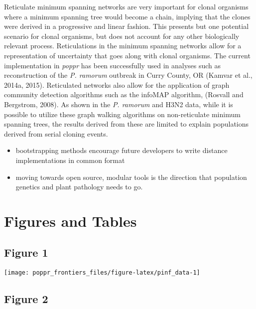 \documentclass{frontiersSCNS} %
\newenvironment{CodeChunk}{}{}
\begin{document}
Reticulate minimum spanning networks are very important for clonal
organisms where a minimum spanning tree would become a chain, implying
that the clones were derived in a progressive and linear fashion. This
presents but one potential scenario for clonal organisms, but does not
account for any other biologically relevant process. Reticulations in
the minimum spanning networks allow for a representation of uncertainty
that goes along with clonal organisms. The current implementation in
\emph{poppr} has been successfully used in analyses such as
reconstruction of the \emph{P. ramorum} outbreak in Curry County, OR
(Kamvar et al., 2014a, 2015). Reticulated networks also allow for the
application of graph community detection algorithms such as the infoMAP
algorithm, (Rosvall and Bergstrom, 2008). As shown in the \emph{P.
ramorum} and H3N2 data, while it is possible to utilize these graph
walking algorithms on non-reticulate minimum spanning trees, the results
derived from these are limited to explain populations derived from
serial cloning events.

\begin{itemize}
\itemsep1pt\parskip0pt
\item
  bootstrapping methods encourage future developers to write distance
  implementations in common format
\item
  moving towards open source, modular tools is the direction that
  population genetics and plant pathology needs to go.
\end{itemize}

\section*{Figures and Tables}\label{figures-and-tables}

\subsection*{Figure 1}\label{figure-1}

\begin{CodeChunk}

\texttt{[image: poppr\_frontiers\_files/figure-latex/pinf\_data-1]} \end{CodeChunk}

\subsection*{Figure 2}\label{figure-2}
\end{document}
